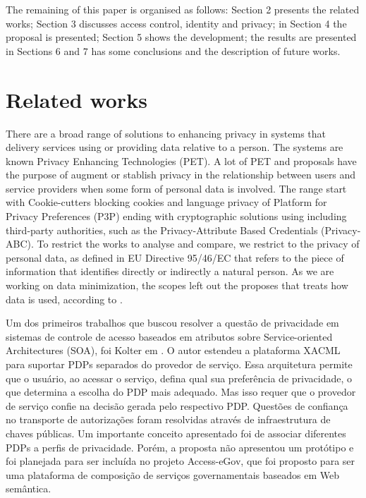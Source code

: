 \documentclass{doublecol-new}
\begin{document}
The remaining of this paper is organised as follows: Section 2 presents the related works; Section 3 discusses access control, identity and privacy; in Section 4 the proposal is presented; Section 5 shows the development; the results are
presented in Sections 6 and 7 has some conclusions and the description of future works.

\section{Related works}
There are a broad range of solutions to enhancing privacy in systems that delivery services using or providing data relative to a person. The systems are known Privacy Enhancing Technologies (PET). A lot of PET and proposals have the purpose of augment or stablish privacy in the relationship between users and service providers when some form of personal data is involved. The range start with Cookie-cutters blocking cookies and language privacy of Platform for Privacy Preferences (P3P) ending with cryptographic solutions using including third-party authorities, such as the Privacy-Attribute Based Credentials (Privacy-ABC). To restrict the works to analyse and compare, we restrict to the privacy of personal data, as defined in EU Directive 95/46/EC\cite{directive199595} that refers to the piece of information that identifies directly or indirectly a natural person. As we are working on data minimization, the scopes left out the proposes that treats how data is used, according to \citep{mondal2014beyond}.

Um dos primeiros trabalhos que buscou resolver a questão de privacidade em sistemas de controle de acesso baseados em atributos sobre Service-oriented Architectures (SOA), foi Kolter em \cite{kolter2007privacy}. O autor estendeu a plataforma XACML para suportar PDPs separados do provedor de serviço. Essa arquitetura permite que o usuário, ao acessar o serviço, defina qual sua preferência de privacidade, o que determina a escolha do PDP mais adequado. Mas isso requer que o provedor de serviço confie na decisão gerada pelo respectivo PDP. Questões de confiança no transporte de autorizações foram resolvidas através de infraestrutura de chaves públicas. Um importante conceito apresentado foi de associar diferentes PDPs a perfis de privacidade. Porém, a proposta não apresentou um protótipo e foi planejada para ser incluída no projeto Access-eGov\cite{pernulAccesseGov}, que foi proposto para ser uma plataforma de composição de serviços governamentais baseados em Web semântica.
\end{document}
